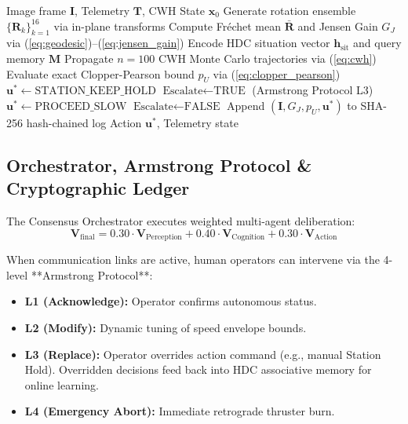 \documentclass[conference]{IEEEtran}
\begin{document}
\begin{algorithm}[t]
\caption{SYMBIOSIS Autonomous Safety Interlock}
\begin{algorithmic}[1]
\REQUIRE Image frame $\mathbf{I}$, Telemetry $\mathbf{T}$, CWH State $\mathbf{x}_0$
\STATE Generate rotation ensemble $\{\mathbf{R}_k\}_{k=1}^{16}$ via in-plane transforms
\STATE Compute Fréchet mean $\bar{\mathbf{R}}$ and Jensen Gain $G_J$ via (\ref{eq:geodesic})--(\ref{eq:jensen_gain})
\STATE Encode HDC situation vector $\mathbf{h}_{\text{sit}}$ and query memory $\mathbf{M}$
\STATE Propagate $n=100$ CWH Monte Carlo trajectories via (\ref{eq:cwh})
\STATE Evaluate exact Clopper-Pearson bound $p_U$ via (\ref{eq:clopper_pearson})
    \STATE $\mathbf{u}^* \leftarrow \text{STATION\_KEEP\_HOLD}$
    \STATE $\text{Escalate} \leftarrow \text{TRUE}$ (Armstrong Protocol L3)
\ELSE
    \STATE $\mathbf{u}^* \leftarrow \text{PROCEED\_SLOW}$
    \STATE $\text{Escalate} \leftarrow \text{FALSE}$
\ENDIF
\STATE Append $(\mathbf{I}, G_J, p_U, \mathbf{u}^*)$ to SHA-256 hash-chained log
\RETURN Action $\mathbf{u}^*$, Telemetry state
\end{algorithmic}
\end{algorithm}

\subsection{Orchestrator, Armstrong Protocol \& Cryptographic Ledger}

The Consensus Orchestrator executes weighted multi-agent deliberation:
\begin{equation}
\mathbf{V}_{\text{final}} = 0.30 \cdot \mathbf{V}_{\text{Perception}} + 0.40 \cdot \mathbf{V}_{\text{Cognition}} + 0.30 \cdot \mathbf{V}_{\text{Action}}
\end{equation}

When communication links are active, human operators can intervene via the 4-level **Armstrong Protocol**:
\begin{itemize}
    \item \textbf{L1 (Acknowledge):} Operator confirms autonomous status.
    \item \textbf{L2 (Modify):} Dynamic tuning of speed envelope bounds.
    \item \textbf{L3 (Replace):} Operator overrides action command (e.g., manual Station Hold). Overridden decisions feed back into HDC associative memory for online learning.
    \item \textbf{L4 (Emergency Abort):} Immediate retrograde thruster burn.
\end{itemize}
\end{document}
